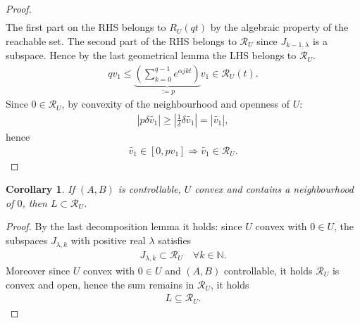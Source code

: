 \documentclass[a4paper,11pt,fleqn]{book}
\newtheorem{corollary}{Corollary}[theorem]
\theoremstyle{definition}
\theoremstyle{remark}
\begin{document}
\begin{proof}
\begin{align*}
	\end{align*}
	The first part on the RHS belongs to $R_U(qt)$ by the algebraic property of the reachable set. The second part of the RHS belongs to $\mathcal{R}_U$ since $J_{k - 1, \lambda}$ is a subspace. Hence by the last geometrical lemma the LHS belongs to $\mathcal{R}_U$. 
	\begin{align*}
		q v_1 \le \underbrace{(\sum_{k = 0}^{ q - 1} e^{\alpha j kt})}_{:= p}v_1 \in \mathcal{R}_U(t). 
	\end{align*}
	Since $0 \in \mathcal{R}_U$, by convexity of the neighbourhood and openness of $U$:  
	\begin{align*}
		|p \delta \tilde{v_1}| \ge |\frac{1}{\delta} \delta \tilde{ v_1}| = |\tilde{v_1}|,
	\end{align*}
	hence
	\begin{align*}
		\tilde{v_1} \in [0, pv_1] \Rightarrow \tilde{v_1} \in \mathcal{R}_U. 
	\end{align*}
\end{proof}

\begin{corollary}
	If $(A, B)$ is controllable, $U$ convex and contains a neighbourhood of $0$, then $L \subset \mathcal{R}_U$. 
\end{corollary}
\begin{proof}
	By the last decomposition lemma it holds: since $U$ convex with $0 \in U$,  the subspaces $J_{\lambda, k}$ with positive real $\lambda$ satisfies
	\begin{align*}
		J_{\lambda, k} \subset \mathcal{R}_U \quad \forall k \in \mathbb{N}. 
	\end{align*}
	Moreover since $U$ convex with $0 \in U$ and $(A, B)$ controllable, it holds $\mathcal{R}_U$ is convex and open, hence the sum remains in $\mathcal{R}_U$, it holds
	\begin{align*}
		L \subseteq \mathcal{R}_U. 
	\end{align*}
\end{proof}
\end{document}
